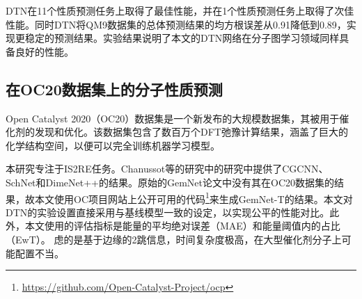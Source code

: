DTN在11个性质预测任务上取得了最佳性能，并在1个性质预测任务上取得了次佳性能。同时DTN将QM9数据集的总体预测结果的均方根误差从0.91降低到0.89，实现更稳定的预测结果。实验结果说明了本文的DTN网络在分子图学习领域同样具备良好的性能。

\subsection{在OC20数据集上的分子性质预测}
Open Catalyst 2020（OC20）数据集\cite{oc20_chanussot_21}是一个新发布的大规模数据集，其被用于催化剂的发现和优化。该数据集包含了数百万个DFT弛豫计算结果，涵盖了巨大的化学结构空间，以便可以完全训练机器学习模型。

本研究专注于IS2RE任务。Chanussot等\cite{oc20_chanussot_21}的研究中的研究中提供了CGCNN、SchNet和DimeNet++的结果。原始的GemNet论文中没有其在OC20数据集的结果，故本文使用OC项目网站上公开可用的代码\footnote{\url{https://github.com/Open-Catalyst-Project/ocp}}来生成GemNet-T的结果。本文对DTN的实验设置直接采用与基线模型一致的设定，以实现公平的性能对比。此外，本文使用的评估指标是能量的平均绝对误差（MAE）和能量阈值内的占比（EwT）。
虑的是基于边缘的2跳信息，时间复杂度极高，在大型催化剂分子上可能配置不当。

